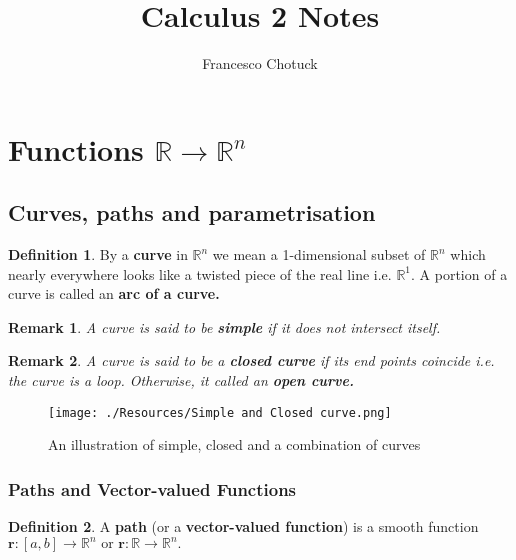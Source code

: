 \documentclass[12pt, a4paper]{article}
\title{Calculus 2 Notes}
\date{}
\author{Francesco Chotuck}
\newcommand{\bb}[1]{\mathbb{#1}}
\newtheorem*{remark}{Remark}
\theoremstyle{definition}
\newtheorem{definition}{Definition}[section]
\theoremstyle{plain}
\begin{document}
 
\maketitle 

\tableofcontents

\pagebreak

\section{Functions \texorpdfstring{$\bb{R} \to \bb{R}^n$}{TEXT}}

\subsection{Curves, paths and parametrisation}

\begin{definition}
By a \textbf{curve} in $\bb{R}^n$ we mean a 1-dimensional subset of $\bb{R}^n$ which nearly everywhere looks like a twisted piece of the real line i.e. $\bb{R}^1.$ A portion of a curve is called an \textbf{arc of a curve.}
\end{definition}

\begin{remark}
A curve is said to be \textbf{simple} if it does not intersect itself.
\end{remark}

\begin{remark}
A curve is said to be a \textbf{closed curve} if its end points coincide i.e. the curve is a loop. Otherwise, it called an \textbf{open curve.}
\end{remark}

\begin{figure}[H]
\centering
\texttt{[image: ./Resources/Simple and Closed curve.png]}
\caption{An illustration of simple, closed and a combination of curves}
\label{fig: Simple/Closed curve}
\end{figure}

\subsubsection{Paths and Vector-valued Functions}

\begin{definition}
A \textbf{path} (or a \textbf{vector-valued function}) is a smooth function $\mathbf{r} : [a,b] \to \bb{R}^n \text{ or } \mathbf{r}: \bb{R} \to \bb{R}^n.$
\end{definition}
\end{document}
